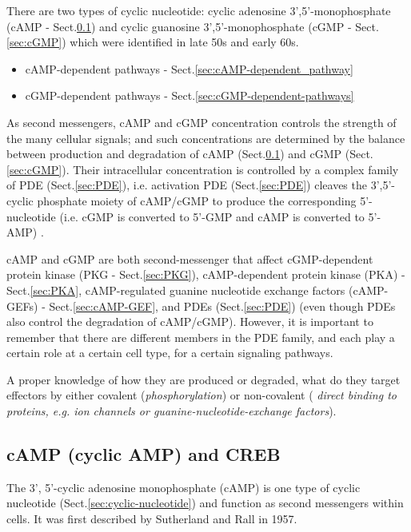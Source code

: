 There are two types of cyclic nucleotide: cyclic adenosine 3',5'-monophosphate
(cAMP - Sect.\ref{sec:cAMP}) and cyclic guanosine 3',5'-monophosphate (cGMP -
Sect.\ref{sec:cGMP}) which were identified in late 50s and early 60s. 
\begin{itemize}
  \item cAMP-dependent pathways - Sect.\ref{sec:cAMP-dependent_pathway}
  
  \item cGMP-dependent pathways - Sect.\ref{sec:cGMP-dependent-pathways}
\end{itemize}
As second messengers, cAMP and cGMP concentration controls the strength of the
many cellular signals; and such concentrations are determined by the balance
between production and degradation of cAMP (Sect.\ref{sec:cAMP}) and cGMP
(Sect.\ref{sec:cGMP}). Their intracellular concentration is controlled by a
complex family of PDE (Sect.\ref{sec:PDE}), i.e.
activation PDE (Sect.\ref{sec:PDE}) cleaves the 3',5'-cyclic phosphate moiety of
cAMP/cGMP to produce the corresponding 5'-nucleotide (i.e. cGMP is converted to
5'-GMP and cAMP is converted to 5'-AMP) \citep{fischmeister2006}.

\begin{framed}

cAMP and cGMP are both second-messenger that affect cGMP-dependent protein
kinase (PKG - Sect.\ref{sec:PKG}), cAMP-dependent protein kinase (PKA) -
Sect.\ref{sec:PKA}, cAMP-regulated guanine nucleotide exchange factors
(cAMP-GEFs) - Sect.\ref{sec:cAMP-GEF}, and PDEs (Sect.\ref{sec:PDE}) (even
though PDEs also control the degradation of cAMP/cGMP). However, it is important
to remember that there are different members in the PDE family, and each play a
certain role at a certain cell type, for a certain signaling pathways.

A proper knowledge of how they are produced or degraded, what do they target
effectors by either covalent ({\it phosphorylation}) or non-covalent ({\it
direct binding to proteins, e.g. ion channels or guanine-nucleotide-exchange
factors}).

\end{framed}

\subsection{cAMP (cyclic AMP) and CREB}
\label{sec:cAMP}
\label{sec:CREB}

The 3', 5'-cyclic adenosine monophosphate (cAMP) is one type of cyclic
nucleotide (Sect.\ref{sec:cyclic-nucleotide}) and function as second messengers
within cells. It was first described by Sutherland and Rall in 1957.

